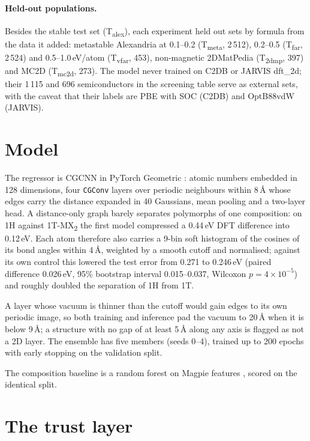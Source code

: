 \documentclass[11pt]{article}
\begin{document}
\paragraph{Held-out populations.} Besides the stable test set (T\textsubscript{alex}),
each experiment held out sets by formula from the data it added: metastable Alexandria
at 0.1--0.2 (T\textsubscript{meta}, 2\,512), 0.2--0.5 (T\textsubscript{far}, 2\,524) and
0.5--1.0\,eV/atom (T\textsubscript{vfar}, 453), non-magnetic 2DMatPedia
(T\textsubscript{2dmp}, 397) and MC2D (T\textsubscript{mc2d}, 273). The model never
trained on C2DB or JARVIS dft\_2d; their 1\,115 and 696 semiconductors in the screening
table serve as external sets, with the caveat that their labels are PBE with SOC (C2DB)
and OptB88vdW (JARVIS).

\section{Model}\label{sec:model}

The regressor is CGCNN \citep{cgcnn} in PyTorch Geometric \citep{pyg}: atomic numbers
embedded in 128 dimensions, four \texttt{CGConv} layers over periodic neighbours within
8\,\AA{} whose edges carry the distance expanded in 40 Gaussians, mean pooling and a
two-layer head. A distance-only graph barely separates polymorphs of one composition:
on 1H against 1T-MX\textsubscript{2} the first model compressed a 0.44\,eV DFT
difference into 0.12\,eV. Each atom therefore also carries a 9-bin soft histogram of
the cosines of its bond angles within 4\,\AA, weighted by a smooth cutoff and
normalised; against its own control this lowered the test error from 0.271 to
0.246\,eV (paired difference 0.026\,eV, 95\% bootstrap interval 0.015--0.037, Wilcoxon
$p = 4\times10^{-5}$) and roughly doubled the separation of 1H from 1T.

A layer whose vacuum is thinner than the cutoff would gain edges to its own periodic
image, so both training and inference pad the vacuum to 20\,\AA{} when it is below
9\,\AA; a structure with no gap of at least 5\,\AA{} along any axis is flagged as not a
2D layer. The ensemble has five members (seeds 0--4), trained up to 200 epochs with
early stopping on the validation split.

The composition baseline is a random forest on Magpie features \citep{magpie}, scored on
the identical split.

\section{The trust layer}\label{sec:trust}
\end{document}
